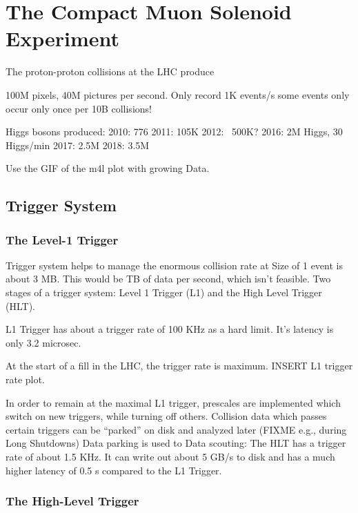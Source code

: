 \chapter{The Compact Muon Solenoid Experiment}
\label{ch:cms}

The proton-proton collisions at the LHC produce 


100M pixels, 40M pictures per second. Only record 1K events/s some events only occur only once per 10B collisions!

Higgs bosons produced:
2010: 776
2011: 105K
2012: ~500K?
2016: 2M Higgs, 30 Higgs/min
2017: 2.5M 
2018: 3.5M

Use the GIF of the m4l plot with growing Data.


\section{Trigger System}
\label{sec:trigger}

\subsection{The Level-1 Trigger}
\label{subsec:L1_trig}

Trigger system helps to manage the enormous collision rate at 
Size of 1 event is about 3 MB.
This would be TB of data per second, which isn't feasible.
Two stages of a trigger system: Level 1 Trigger (L1) and the High Level Trigger (HLT).

L1 Trigger has about a trigger rate of 100 KHz as a hard limit.
It's latency is only 3.2 microsec.

At the start of a fill in the LHC, the trigger rate is maximum.
INSERT L1 trigger rate plot.

In order to remain at the maximal L1 trigger, prescales are implemented which switch on new triggers, while turning off others.
Collision data which passes certain triggers can be ``parked'' on disk and analyzed later (FIXME e.g., during Long Shutdowns)  Data parking is used to 
Data scouting: 
The HLT has a trigger rate of about 1.5 KHz.
It can write out about 5 GB/s to disk and has a much higher latency of 0.5 s compared to the L1 Trigger.



\subsection{The High-Level Trigger}
\label{subsec:hlt}